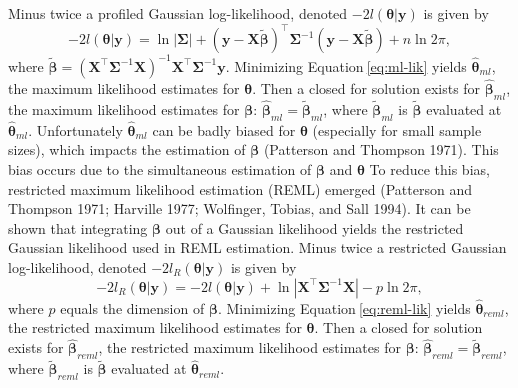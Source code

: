 \documentclass{article}
\begin{document}
Minus twice a profiled Gaussian log-likelihood, denoted
\(-2l(\bm{\theta} | \mathbf{y})\) is given by
\begin{equation}\label{eq:ml-lik}
  -2l(\bm{\theta} | \mathbf{y}) = \ln{|\mathbf{\Sigma}|} + (\mathbf{y} - \mathbf{X} \tilde{\bm{\beta}})^\intercal \mathbf{\Sigma}^{-1} (\mathbf{y} - \mathbf{X} \tilde{\bm{\beta}}) + n \ln{2\pi},
\end{equation} where
\(\tilde{\bm{\beta}} = (\mathbf{X}^\intercal \mathbf{\Sigma}^{-1} \mathbf{X})^{-1} \mathbf{X}^\intercal \mathbf{\Sigma}^{-1} \mathbf{y}\).
Minimizing Equation\(~\)\ref{eq:ml-lik} yields
\(\bm{\hat{\theta}}_{ml}\), the maximum likelihood estimates for
\(\bm{\theta}\). Then a closed for solution exists for
\(\bm{\hat{\beta}}_{ml}\), the maximum likelihood estimates for
\(\bm{\beta}\): \(\bm{\hat{\beta}}_{ml} = \tilde{\bm{\beta}}_{ml}\),
where \(\tilde{\bm{\beta}}_{ml}\) is \(\tilde{\bm{\beta}}\) evaluated at
\(\bm{\hat{\theta}}_{ml}\). Unfortunately \(\bm{\hat{\theta}}_{ml}\) can
be badly biased for \(\bm{\theta}\) (especially for small sample sizes),
which impacts the estimation of \(\bm{\beta}\) (Patterson and Thompson
1971). This bias occurs due to the simultaneous estimation of
\(\bm{\beta}\) and \(\bm{\theta}\) To reduce this bias, restricted
maximum likelihood estimation (REML) emerged (Patterson and Thompson
1971; Harville 1977; Wolfinger, Tobias, and Sall 1994). It can be shown
that integrating \(\bm{\beta}\) out of a Gaussian likelihood yields the
restricted Gaussian likelihood used in REML estimation. Minus twice a
restricted Gaussian log-likelihood, denoted
\(-2l_R(\bm{\theta} | \mathbf{y})\) is given by
\begin{equation}\label{eq:reml-lik}
  -2l_R(\bm{\theta} | \mathbf{y}) = -2l(\bm{\theta} | \mathbf{y})  + \ln{|\mathbf{X}^\intercal \mathbf{\Sigma}^{-1} \mathbf{X}|} - p \ln{2\pi} ,
\end{equation} where \(p\) equals the dimension of \(\bm{\beta}\).
Minimizing Equation\(~\)\ref{eq:reml-lik} yields
\(\bm{\hat{\theta}}_{reml}\), the restricted maximum likelihood
estimates for \(\bm{\theta}\). Then a closed for solution exists for
\(\bm{\hat{\beta}}_{reml}\), the restricted maximum likelihood estimates
for \(\bm{\beta}\):
\(\bm{\hat{\beta}}_{reml} = \tilde{\bm{\beta}}_{reml}\), where
\(\tilde{\bm{\beta}}_{reml}\) is \(\tilde{\bm{\beta}}\) evaluated at
\(\bm{\hat{\theta}}_{reml}\).
\end{document}
